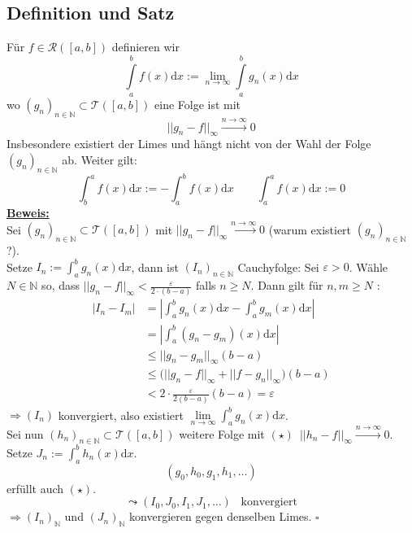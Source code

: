 \subsection{Definition und Satz} %
\label{sub:definition_und_satz}
Für $f \in \mathcal{R}([a,b]) $ definieren wir
\[
	\int\limits_{a}^{b} \!f(x)  \mathrm{d} x  := \lim\limits_{n \to \infty} \int\limits_{a}^{b} \! g_n (x)  \mathrm{d} x 
\]
wo $(g_n)_{n \in \mathds{N}} \subset \mathcal{T} ([a,b])$ eine Folge ist mit 
\[
	||g_n - f||_\infty \xrightarrow{n \to \infty} 0
\]
Insbesondere existiert der Limes und hängt nicht von der Wahl der Folge $(g_n)_{n \in \mathds{N}}$ ab. Weiter gilt:
\[
	\int_{b} ^{a} \! f(x) \mathrm{d} x := - \int_{a} ^{b} \! f(x)  \mathrm{d} x \qquad \int_{a} ^{a} \! f(x)  \mathrm{d} x := 0
\]
\underline{\textbf{Beweis:}} \\
Sei $(g_n)_{n \in \mathds{N}} \subset \mathcal{T} ([a,b])$ mit $||g_n - f||_\infty \xrightarrow{n \to \infty} 0$ (warum existiert $(g_n)_{n \in \mathds{N}}$ ?). \\
Setze $I_n := \int_{a} ^{b} \! g_n (x)  \mathrm{d} x $, dann ist $(I_n)_{n \in \mathds{N}}$ Cauchyfolge: Sei $\varepsilon >0$. Wähle $N \in \mathds{N}$ so, dass
$|| g_n -f  ||_\infty < \frac{\varepsilon}{2 \cdot (b-a)} $ falls $n \ge N$. Dann gilt für $n,m \ge N$ :
\begin{align*}
	|I_n - I_m | &=  \left| \int_{a} ^{b} \! g_n (x)  \mathrm{d} x  - \int_{a} ^{b} \! g_m(x)  \mathrm{d} x \right| \\
	&= \left| \int_{a} ^{b} \! (g_n -g_m) (x)  \mathrm{d} x   \right| \tag*{nach 13.4(i)} \\
	&\le || g_n - g_m ||_\infty (b-a) \tag*{13.4.(ii)} \\
	&\le \big( || g_n - f ||_\infty + || f - g_n ||_\infty  \big) (b-a) \\
	&<  2 \cdot \frac{\varepsilon}{2(b-a)} (b-a) = \varepsilon 
\end{align*}
$\Rightarrow (I_n)$ konvergiert, also existiert $\lim\limits_{n \to \infty} \int_{a} ^{b} \! g_n (x)  \mathrm{d} x $.
\vspace{10pt} \\
Sei nun $(h_n)_{n \in \mathds{N}} \subset \mathcal{T} ([a,b])$ weitere Folge mit $(\star) \enspace || h_n -f  ||_\infty \xrightarrow{n \to \infty} 0$. Setze 
$J_n := \int_{a} ^{b} \! h_n (x)  \mathrm{d}x$.
\[
	(g_0, h_0 , g_1, h_1, \ldots )
\] 
erfüllt auch $(\star)$. 
\[
	\leadsto (I_0, J_0, I_1 , J_1, \ldots ) \enspace \text{ konvergiert}
\]
$\Rightarrow (I_n)_{\mathds{N}}$ und $(J_n)_\mathds{N}$ konvergieren gegen denselben Limes. \hfill \( \square \)


